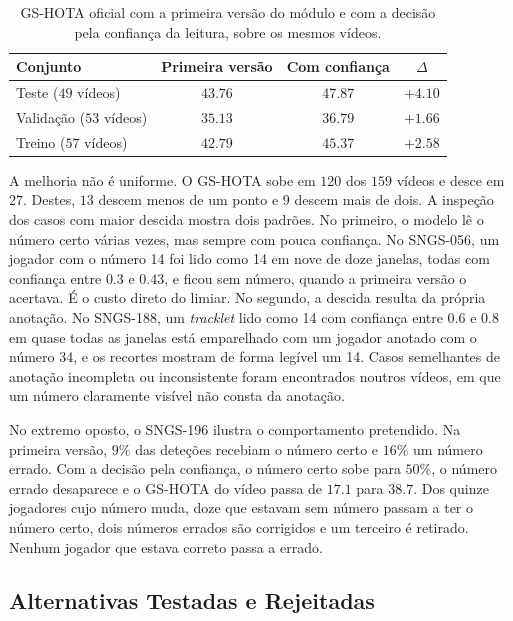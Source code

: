 \begin{table}[htbp]
    \centering
    \caption{GS-HOTA oficial com a primeira versão do módulo e com a decisão pela confiança da
    leitura, sobre os mesmos vídeos.}
    \label{tab:jnr-confianca-gshota}
    \begin{tabular}{|l|c|c|c|}
        \hline
        \textbf{Conjunto} & \textbf{Primeira versão} & \textbf{Com confiança} & \textbf{$\Delta$} \\
        \hline
        Teste ($49$ vídeos)     & $43.76$ & $47.87$ & $+4.10$ \\
        \hline
        Validação ($53$ vídeos) & $35.13$ & $36.79$ & $+1.66$ \\
        \hline
        Treino ($57$ vídeos)    & $42.79$ & $45.37$ & $+2.58$ \\
        \hline
    \end{tabular}
\end{table}

A melhoria não é uniforme. O GS-HOTA sobe em $120$ dos $159$ vídeos e desce em $27$. Destes,
$13$ descem menos de um ponto e $9$ descem mais de dois. A inspeção dos casos com maior descida mostra dois padrões. No primeiro, o modelo lê o número
certo várias vezes, mas sempre com pouca confiança. No SNGS-056, um jogador com o número 14 foi
lido como 14 em nove de doze janelas, todas com confiança entre $0.3$ e $0.43$, e ficou sem número,
quando a primeira versão o acertava. É o custo direto do limiar. No segundo, a descida resulta da
própria anotação. No SNGS-188, um \emph{tracklet} lido como 14 com confiança entre $0.6$ e $0.8$ em
quase todas as janelas está emparelhado com um jogador anotado com o número 34, e os recortes
mostram de forma legível um 14. Casos semelhantes de anotação incompleta ou inconsistente foram
encontrados noutros vídeos, em que um número claramente visível não consta da anotação.

No extremo oposto, o SNGS-196 ilustra o comportamento pretendido. Na primeira versão, $9\%$ das
deteções recebiam o número certo e $16\%$ um número errado. Com a decisão pela confiança, o número
certo sobe para $50\%$, o número errado desaparece e o GS-HOTA do vídeo passa de $17.1$ para $38.7$. Dos quinze jogadores cujo número muda, doze que estavam sem número passam a ter o
número certo, dois números errados são corrigidos e um terceiro é retirado. Nenhum jogador que
estava correto passa a errado.

\subsection{Alternativas Testadas e Rejeitadas}\label{sec:res_jnr_rejeitadas}

